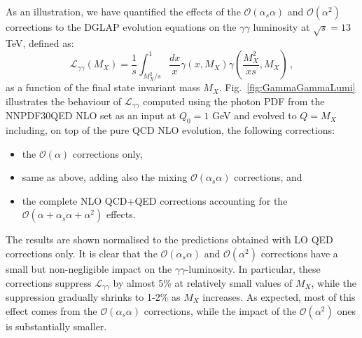 As an illustration, we have quantified the effects of the
$\mathcal{O}(\alpha_s\alpha)$ and $\mathcal{O}(\alpha^2)$ corrections
to the DGLAP evolution equations on the $\gamma\gamma$ luminosity at
$\sqrt{s} = 13$ TeV, defined as:
\begin{equation}\label{eq:GammaGammaLumi}
\mathcal{L}_{\gamma\gamma}(M_X) = \frac1{s}\int_{M_X^2/s}^1
\frac{dx}{x} \gamma(x,M_X) \gamma\left(\frac{M_X^2}{xs},M_X\right)\,,
\end{equation}
as a function of the final state invariant mass $M_X$.
%
Fig.~\ref{fig:GammaGammaLumi} illustrates the behaviour of
$\mathcal{L}_{\gamma\gamma}$ computed using the photon PDF from the
NNPDF30QED NLO set as an input at $Q_0 = 1$ GeV and evolved to $Q=M_X$
including, on top of the pure QCD NLO evolution, the following
corrections:
\begin{itemize}
\item the $\mathcal{O}(\alpha)$ corrections only,
\item same as above, adding also the mixing
  $\mathcal{O}(\alpha_s\alpha)$ corrections, and
\item the complete NLO QCD+QED corrections accounting for the
  $\mathcal{O}(\alpha+\alpha_s\alpha+\alpha^2)$ effects.
\end{itemize}
The results are shown normalised to the predictions obtained with LO
QED corrections only.
%
It is clear that the $\mathcal{O}(\alpha_s\alpha)$ and
$\mathcal{O}(\alpha^2)$ corrections have a small but non-negligible
impact on the $\gamma\gamma$-luminosity. In particular, these
corrections suppress $\mathcal{L}_{\gamma\gamma}$ by almost 5\% at
relatively small values of $M_X$, while the suppression gradually
shrinks to 1-2\% as $M_X$ increases. As expected, most of this effect
comes from the $\mathcal{O}(\alpha_s\alpha)$ corrections, while the
impact of the $\mathcal{O}(\alpha^2)$ ones is substantially smaller.

